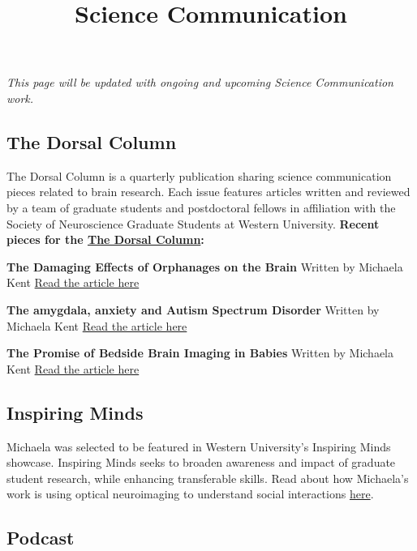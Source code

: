 \documentclass[
]{article}
\title{Science Communication}
\author{}
\date{\vspace{-2.5em}}
\begin{document}
\maketitle

\emph{This page will be updated with ongoing and upcoming Science
Communication work.}

\hypertarget{the-dorsal-column}{%
\subsection{The Dorsal Column}\label{the-dorsal-column}}

The Dorsal Column is a quarterly publication sharing science
communication pieces related to brain research. Each issue features
articles written and reviewed by a team of graduate students and
postdoctoral fellows in affiliation with the Society of Neuroscience
Graduate Students at Western University. \textbf{Recent pieces for the
\href{https://songsuwo.ca/dc-about-us}{The Dorsal Column}:}

\textbf{The Damaging Effects of Orphanages on the Brain} Written by
Michaela Kent
\href{https://songsuwo.ca/thedorsalcolumn/vol3-iss2-michaela-kent}{Read
the article here}

\textbf{The amygdala, anxiety and Autism Spectrum Disorder} Written by
Michaela Kent
\href{https://songsuwo.ca/thedorsalcolumn/vol3-iss4-michaela-kent}{Read
the article here}

\textbf{The Promise of Bedside Brain Imaging in Babies} Written by
Michaela Kent
\href{https://songsuwo.ca/thedorsalcolumn/vol4-iss2-michaela-kent}{Read
the article here}

\hypertarget{inspiring-minds}{%
\subsection{Inspiring Minds}\label{inspiring-minds}}

Michaela was selected to be featured in Western University's Inspiring
Minds showcase. Inspiring Minds seeks to broaden awareness and impact of
graduate student research, while enhancing transferable skills. Read
about how Michaela's work is using optical neuroimaging to understand
social interactions \href{https://fal.cn/3x5T4}{here}.

\hypertarget{podcast}{%
\subsection{Podcast}\label{podcast}}
\end{document}
